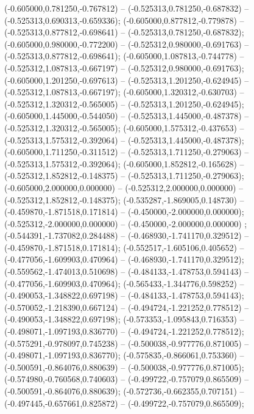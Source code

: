  (-0.605000,0.781250,-0.767812) -- (-0.525313,0.781250,-0.687832) -- (-0.525313,0.690313,-0.659336);
 (-0.605000,0.877812,-0.779878) -- (-0.525313,0.877812,-0.698641) -- (-0.525313,0.781250,-0.687832);
 (-0.605000,0.980000,-0.772200) -- (-0.525312,0.980000,-0.691763) -- (-0.525313,0.877812,-0.698641);
 (-0.605000,1.087813,-0.744778) -- (-0.525312,1.087813,-0.667197) -- (-0.525312,0.980000,-0.691763);
 (-0.605000,1.201250,-0.697613) -- (-0.525313,1.201250,-0.624945) -- (-0.525312,1.087813,-0.667197);
 (-0.605000,1.320312,-0.630703) -- (-0.525312,1.320312,-0.565005) -- (-0.525313,1.201250,-0.624945);
 (-0.605000,1.445000,-0.544050) -- (-0.525313,1.445000,-0.487378) -- (-0.525312,1.320312,-0.565005);
 (-0.605000,1.575312,-0.437653) -- (-0.525313,1.575312,-0.392064) -- (-0.525313,1.445000,-0.487378);
 (-0.605000,1.711250,-0.311512) -- (-0.525313,1.711250,-0.279063) -- (-0.525313,1.575312,-0.392064);
 (-0.605000,1.852812,-0.165628) -- (-0.525312,1.852812,-0.148375) -- (-0.525313,1.711250,-0.279063);
 (-0.605000,2.000000,0.000000) -- (-0.525312,2.000000,0.000000) -- (-0.525312,1.852812,-0.148375);
 (-0.535287,-1.869005,0.148730) -- (-0.459870,-1.871518,0.171814) -- (-0.450000,-2.000000,0.000000);
 (-0.525312,-2.000000,0.000000) -- (-0.450000,-2.000000,0.000000) ;
 (-0.544391,-1.737082,0.284488) -- (-0.468930,-1.741170,0.329512) -- (-0.459870,-1.871518,0.171814);
 (-0.552517,-1.605106,0.405652) -- (-0.477056,-1.609903,0.470964) -- (-0.468930,-1.741170,0.329512);
 (-0.559562,-1.474013,0.510698) -- (-0.484133,-1.478753,0.594143) -- (-0.477056,-1.609903,0.470964);
 (-0.565433,-1.344776,0.598252) -- (-0.490053,-1.348822,0.697198) -- (-0.484133,-1.478753,0.594143);
 (-0.570052,-1.218390,0.667124) -- (-0.494724,-1.221252,0.778512) -- (-0.490053,-1.348822,0.697198);
 (-0.573353,-1.095843,0.716353) -- (-0.498071,-1.097193,0.836770) -- (-0.494724,-1.221252,0.778512);
 (-0.575291,-0.978097,0.745238) -- (-0.500038,-0.977776,0.871005) -- (-0.498071,-1.097193,0.836770);
 (-0.575835,-0.866061,0.753360) -- (-0.500591,-0.864076,0.880639) -- (-0.500038,-0.977776,0.871005);
 (-0.574980,-0.760568,0.740603) -- (-0.499722,-0.757079,0.865509) -- (-0.500591,-0.864076,0.880639);
 (-0.572736,-0.662355,0.707151) -- (-0.497445,-0.657661,0.825872) -- (-0.499722,-0.757079,0.865509);
